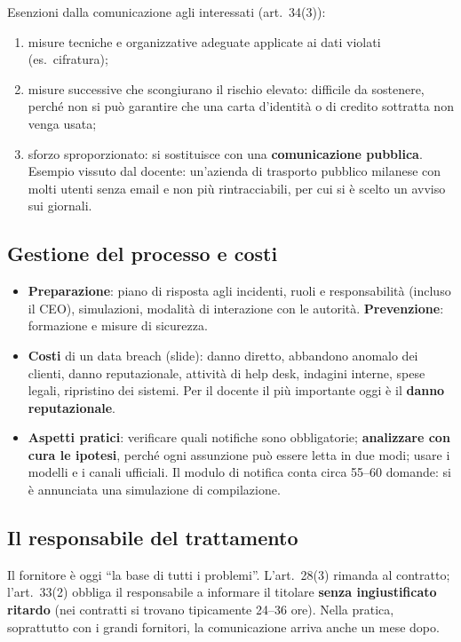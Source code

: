 Esenzioni dalla comunicazione agli interessati (art.~34(3)):
\begin{enumerate}[label=\alph*)]
  \item misure tecniche e organizzative adeguate applicate ai dati violati (es.\ cifratura);
  \item misure successive che scongiurano il rischio elevato: difficile da sostenere, perché non si
    può garantire che una carta d'identità o di credito sottratta non venga usata;
  \item sforzo sproporzionato: si sostituisce con una \textbf{comunicazione pubblica}. Esempio vissuto
    dal docente: un'azienda di trasporto pubblico milanese con molti utenti senza email e non più
    rintracciabili, per cui si è scelto un avviso sui giornali.
\end{enumerate}

\subsection{Gestione del processo e costi}
\begin{itemize}
  \item \textbf{Preparazione}: piano di risposta agli incidenti, ruoli e responsabilità (incluso il
    CEO), simulazioni, modalità di interazione con le autorità. \textbf{Prevenzione}: formazione e
    misure di sicurezza.
  \item \textbf{Costi} di un data breach (slide): danno diretto, abbandono anomalo dei clienti, danno
    reputazionale, attività di help desk, indagini interne, spese legali, ripristino dei sistemi. Per il
    docente il più importante oggi è il \textbf{danno reputazionale}.
  \item \textbf{Aspetti pratici}: verificare quali notifiche sono obbligatorie; \textbf{analizzare con
    cura le ipotesi}, perché ogni assunzione può essere letta in due modi; usare i modelli e i canali
    ufficiali. Il modulo di notifica conta circa 55--60 domande: si è annunciata una simulazione di
    compilazione.
\end{itemize}

\subsection{Il responsabile del trattamento}
Il fornitore è oggi ``la base di tutti i problemi''. L'art.~28(3) rimanda al contratto; l'art.~33(2)
obbliga il responsabile a informare il titolare \textbf{senza ingiustificato ritardo} (nei contratti
si trovano tipicamente 24--36 ore). Nella pratica, soprattutto con i grandi fornitori, la
comunicazione arriva anche un mese dopo.

